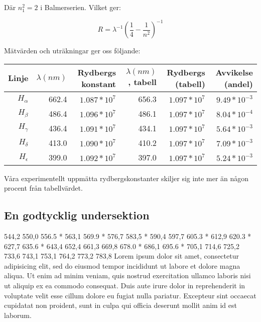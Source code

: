 \documentclass[a4paper,10pt]{article}
\begin{document}
Där $n_1^2 = 2$ i Balmerserien. Vilket ger:

$$ R = \lambda^{-1}\left(\frac{1}{4} - \frac{1}{n^2}\right)^{-1} $$

Mätvärden och uträkningar ger oss följande:

\begin{center}
\begin{tabular}[c]{|r||r|r||r|r||r|}
	\hline
	Linje & $\lambda (nm)$ & Rydbergs konstant & $\lambda (nm)$, tabell & Rydbergs (tabell) & Avvikelse (andel) \\
	\hline
	\hline
	$H_\alpha$ & 662.4 & $1.087*10^7$ & 656.3 & $1.097*10^7$ & $9.49*10^{-3}$ \\
	$H_\beta$ & 486.4 & $1.096*10^7$ & 486.1 & $1.097*10^7$ & $8.04*10^{-4}$ \\
	$H_\gamma$ & 436.4 & $1.091*10^7$ & 434.1 & $1.097*10^7$ & $5.64*10^{-3}$ \\
	$H_\delta$ & 413.0 & $1.090*10^7$ & 410.2 & $1.097*10^7$ & $7.09*10^{-3}$\\
	$H_\epsilon$ & 399.0 & $1.092*10^7$ & 397.0 & $1.097*10^7$ & $5.24*10^{-3}$ \\
	\hline
\end{tabular}
\end{center}

Våra experimentellt uppmätta rydbergskonstanter skiljer sig inte mer än någon procent från tabellvärdet.

\subsection{En godtycklig undersektion} %

544,2
550,0
556.5 *
563,1
569.9 *
576,7
583,5 *
590,4
597,7
605.3 *
612,9
620.3 *
627,7
635.6 *
643,4
652,4
661,3
669,8
678.0 *
686,1
695.6 *
705,1
714,6
725,2
733,6
743,1
753,1
764,2
773,2
783,8
Lorem ipsum dolor sit amet, consectetur adipisicing elit, sed do eiusmod tempor incididunt ut labore et dolore magna aliqua. Ut enim ad minim veniam, quis nostrud exercitation ullamco laboris nisi ut aliquip ex ea commodo consequat. Duis aute irure dolor in reprehenderit in voluptate velit esse cillum dolore eu fugiat nulla pariatur. Excepteur sint occaecat cupidatat non proident, sunt in culpa qui officia deserunt mollit anim id est laborum.
\end{document}
